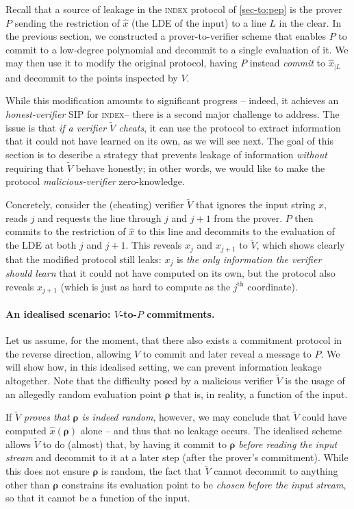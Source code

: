 \documentclass[a4paper,UKenglish,cleveref, autoref, thm-restate]{lipics-v2021}
\theoremstyle{definition}
\newcommand{\indexproblem}{\normalfont\textsc{index}\xspace}
\newcommand{\fingerprinttuple}{\bm{\rho}}
\renewcommand{\line}{L}
\begin{document}
   Recall that a source of leakage in the \indexproblem protocol of \cref{sec-to:pep} is the prover $P$ sending the restriction of $\hat x$ (the LDE of the input) to a line $\line$ in the clear. In the previous section, we constructed a prover-to-verifier scheme that enables $P$ to commit to a low-degree polynomial and decommit to a single evaluation of it. We may then use it to modify the original protocol, having $P$ instead \emph{commit} to $\hat x_{|\line}$ and decommit to the points inspected by $V$.
   
   While this modification amounts to significant progress -- indeed, it achieves an \emph{honest-verifier} SIP for \indexproblem  -- there is a second major challenge to address. The issue is that \emph{if a verifier $\widetilde V$ cheats}, it can use the protocol to extract information that it could not have learned on its own, as we will see next. The goal of this section is to describe a strategy that prevents leakage of information \emph{without} requiring that $\widetilde V$ behave honestly; in other words, we would like to make the protocol \emph{malicious-verifier} zero-knowledge.
    
    Concretely, consider the (cheating) verifier $\widetilde V$ that ignores the input string $x$, reads $j$ and requests the line through $j$ and $j + 1$ from the prover. $P$ then commits to the restriction of $\hat x$ to this line and decommits to the evaluation of the LDE at both $j$ and $j + 1$. This reveals $x_j$ and $x_{j+1}$ to $\widetilde V$, which shows clearly that the modified protocol still leaks: $x_j$ is \emph{the only information the verifier should learn} that it could not have computed on its own, but the protocol also reveals $x_{j+1}$ (which is just as hard to compute as the $j^\text{th}$ coordinate).
    
    \paragraph*{An idealised scenario: $V$-to-$P$ commitments\iflipics\else.\fi} Let us assume, for the moment, that there also exists a commitment protocol in the reverse direction, allowing $V$ to commit and later reveal a message to $P$. We will show how, in this idealised setting, we can prevent information leakage altogether. Note that the difficulty posed by a malicious verifier $\widetilde V$ is the usage of an allegedly random evaluation point $\fingerprinttuple$ that is, in reality, a function of the input.
    
    If $\widetilde V$ \emph{proves that $\fingerprinttuple$ is indeed random}, however, we may conclude that $\widetilde V$ could have computed $\hat x(\fingerprinttuple)$ alone -- and thus that no leakage occurs. The idealised scheme allows $\widetilde V$ to do (almost) that, by having it commit to $\fingerprinttuple$ \emph{before reading the input stream} and decommit to it at a later step (after the prover's commitment). While this does not ensure $\fingerprinttuple$ is random, the fact that $\widetilde V$ cannot decommit to anything other than $\fingerprinttuple$ constrains its evaluation point to be \emph{chosen before the input stream}, so that it cannot be a function of the input.
    
\end{document}
